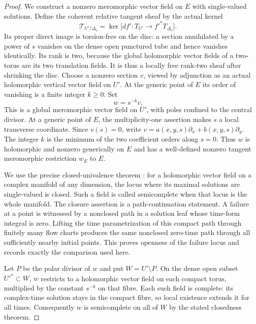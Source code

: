 \begin{proof}
We construct a nonzero meromorphic vector field
on $E$ with single-valued solutions. Define the
coherent relative tangent sheaf by the actual
kernel
\[
 \mathcal T_{U'/\Delta_s}
 =\ker\bigl[df':T_{U'}\longrightarrow f'^*T_{\Delta_s}\bigr].
 \tag{C.SC.4}
\]
Its proper direct image is torsion-free on the
disc: a section annihilated by a power of $s$
vanishes on the dense open punctured tube and
hence vanishes identically. Its rank is two,
because the global holomorphic vector fields
of a two-torus are its two translation fields.
It is thus a locally free rank-two sheaf after
shrinking the disc. Choose a nonzero section
$v$, viewed by adjunction as an actual
holomorphic vertical vector field on $U'$.
At the generic point of $E$ its order of
vanishing is a finite integer $k\ge0$.
Set
\[
                              w=s^{-k}v.
 \tag{C.SC.5}
\]
This is a global meromorphic vector field on
$U'$, with poles confined to the central
divisor. At a generic point of $E$, the
multiplicity-one assertion makes $s$ a local
transverse coordinate. Since $v(s)=0$, write
$v=a(x,y,s)\partial_x+b(x,y,s)\partial_y$.
The integer $k$ is the minimum of the two
coefficient orders along $s=0$. Thus $w$
is holomorphic and nonzero generically on
$E$ and has a well-defined nonzero tangent
meromorphic restriction $w_E$ to $E$.

We use the precise closed-univalence theorem
\cite[Theorem~3.3, with its proof]{Guillot2024}:
for a holomorphic vector field on a complex
manifold of any dimension, the locus where
its maximal solutions are single-valued is
closed. Such a field is called semicomplete
when that locus is the whole manifold.
The closure assertion is a path-continuation
statement. A failure at a point is witnessed
by a nonclosed path in a solution leaf whose
time-form integral is zero. Lifting the
time parametrization of this compact path
through finitely many flow charts produces
the same nonclosed zero-time path through
all sufficiently nearby initial points.
This proves openness of the failure locus
and records exactly the comparison used here.

Let $P$ be the polar divisor of $w$ and put
$W=U'\setminus P$. On the dense open subset
$U'^*\subset W$, $w$ restricts to a
holomorphic vector field on each compact
torus, multiplied by the constant $s^{-k}$
on that fibre. Each such field is complete:
its complex-time solution stays in the
compact fibre, so local existence extends
it for all times. Consequently $w$ is
semicomplete on all of $W$ by the stated
closedness theorem.


\end{proof}
